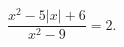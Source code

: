 \begin{ex}[type=equation]
	\begin{condition}
		$\dfrac{x^2 - 5\big|x\big| + 6}{x^2 - 9} = 2.$
	\end{condition}
\end{ex}